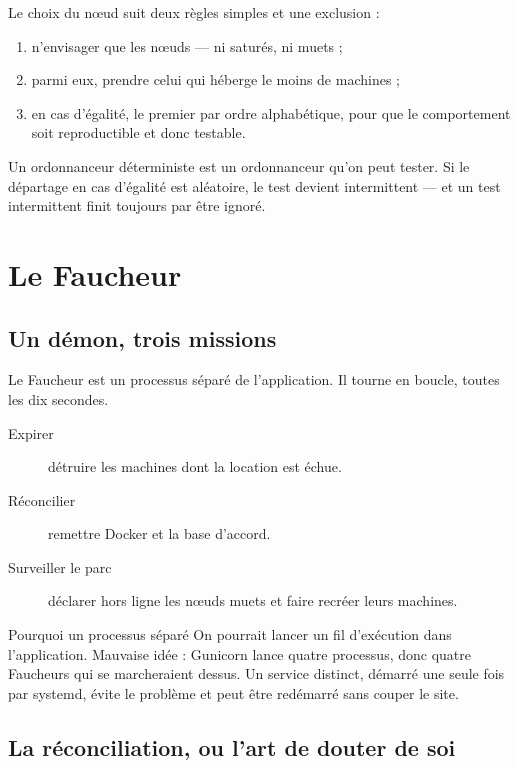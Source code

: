 Le choix du nœud suit deux règles simples et une exclusion :

\begin{enumerate}
\item n'envisager que les nœuds  --- ni saturés, ni muets ;
\item parmi eux, prendre celui qui héberge le moins de machines ;
\item en cas d'égalité, le premier par ordre alphabétique, pour que le
  comportement soit reproductible et donc testable.
\end{enumerate}

\begin{retenir}
Un ordonnanceur déterministe est un ordonnanceur qu'on peut tester. Si le
départage en cas d'égalité est aléatoire, le test devient intermittent --- et
un test intermittent finit toujours par être ignoré.
\end{retenir}

\chapter{Le Faucheur}
\label{chap:faucheur}

\section{Un démon, trois missions}

Le Faucheur est un processus séparé de l'application. Il tourne en boucle,
toutes les dix secondes.

\begin{description}
\item[Expirer] détruire les machines dont la location est échue.
\item[Réconcilier] remettre Docker et la base d'accord.
\item[Surveiller le parc] déclarer hors ligne les nœuds muets et faire
  recréer leurs machines.
\end{description}

\begin{notion}{Pourquoi un processus séparé}
On pourrait lancer un fil d'exécution dans l'application. Mauvaise idée :
Gunicorn lance quatre processus, donc quatre Faucheurs qui se marcheraient
dessus. Un service distinct, démarré une seule fois par systemd, évite le
problème et peut être redémarré sans couper le site.
\end{notion}

\section{La réconciliation, ou l'art de douter de soi}


